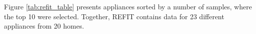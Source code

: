 Figure \ref{tab:refit_table} presents appliances sorted by a number of samples, where the top 10 were selected.
Together, REFIT contains data for 23 different appliances from 20 homes.


